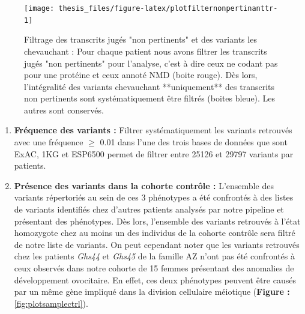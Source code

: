\documentclass[12pt,twoside]{reedthesis}
\theoremstyle{definition}
\theoremstyle{definition}
\theoremstyle{remark}
\begin{document}
  \newpage 
  
  \begin{figure}
  
  {\centering \texttt{[image: thesis\_files/figure-latex/plotfilternonpertinanttr-1]} 
  
  }
  
  \caption[Filtrage des transcrits jugés "non pertinents" et des variants les chevauchant]{Filtrage des transcrits jugés "non pertinents" et des variants les chevauchant : Pour chaque patient nous avons filtrer les transcrits jugés "non pertinents" pour l'analyse, c'est à dire ceux ne codant pas pour une protéine et ceux annoté NMD (boite rouge). Dès lors, l'intégralité des variants chevauchant **uniquement** des transcrits non pertinents sont systématiquement être filtrés (boites bleue). Les autres sont conservés.}\label{fig:plotfilternonpertinanttr}
  \end{figure}
  
  \begin{enumerate}
  \def\labelenumi{\arabic{enumi}.}
  \setcounter{enumi}{4}
  \item
    \textbf{Fréquence des variants :} Filtrer systématiquement les
    variants retrouvés avec une fréquence \(\ge\) 0.01 dans l'une des
    trois bases de données que sont ExAC, 1KG et ESP6500 permet de filtrer
    entre 25126 et 29797 variants par patients.
  \item
    \textbf{Présence des variants dans la cohorte contrôle :} L'ensemble
    des variants répertoriés au sein de ces 3 phénotypes a été confrontés
    à des listes de variants identifiés chez d'autres patients analysés
    par notre pipeline et présentant des phénotypes. Dès lors, l'ensemble
    des variants retrouvés à l'état homozygote chez au moins un des
    individus de la cohorte contrôle sera filtré de notre liste de
    variants. On peut cependant noter que les variants retrouvés chez les
    patients \emph{Ghs44} et \emph{Ghs45} de la famille AZ n'ont pas été
    confrontés à ceux observés dans notre cohorte de 15 femmes présentant
    des anomalies de développement ovocitaire. En effet, ces deux
    phénotypes peuvent être causés par un même gène impliqué dans la
    division cellulaire méiotique (\textbf{Figure :}
    \ref{fig:plotsamplectrl}).\\
    \newpage
  \end{enumerate}
  
\end{document}
